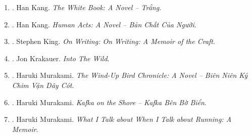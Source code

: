 \documentclass{article}
\begin{document}
\begin{enumerate}
	\item \cite{Kang_white_VN}. {\sc Han Kang}. {\it The White Book: A Novel -- Trắng}.\hfill{\sf[done]}
	
	\item \cite{Kang_human_nature_VN}. {\sc Han Kang}. {\it Human Acts: A Novel -- Bản Chất Của Người}.\hfill{\sf[done]}
	
	\item \cite{King2000,King2010}. Stephen King. {\it On Writing: On Writing: A Memoir of the Craft}.\hfill{\sf[done]}
	
	\item \cite{Krakauer_wild}. {\sc Jon Krakauer}. {\it Into The Wild}.
	
	\item \cite{Murakami_bird_VN}. {\sc Haruki Murakami}. {\it The Wind-Up Bird Chronicle: A Novel -- Biên Niên Ký Chim Vặn Dây Cót}.\hfill{\sf[done]}
	
	\item \cite{Murakami_Kafka_VN}. {\sc Haruki Murakami}. {\it Kafka on the Shore -- Kafka Bên Bờ Biển}.\hfill{\sf[done]}
	
	\item \cite{Murakami_run}. {\sc Haruki Murakami}. {\it What I Talk about When I Talk about Running: A Memoir}. {}
	

\end{enumerate}
\end{document}
